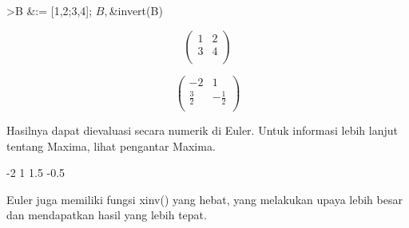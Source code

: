 \documentclass[a4paper,10pt]{article}
\begin{document}
\begin{eulernotebook}
\begin{eulercomment}
\begin{eulercomment}
\begin{eulercomment}
\begin{eulercomment}
\begin{eulercomment}
\begin{eulercomment}
\begin{eulerttcomment}
\end{eulerttcomment}
\begin{eulerprompt}
>B &:= [1,2;3,4]; $B, $&invert(B)
\end{eulerprompt}
\begin{eulerformula}
\[
\begin{pmatrix}1 & 2 \\ 3 & 4 \\ \end{pmatrix}
\]
\end{eulerformula}
\begin{eulerformula}
\[
\begin{pmatrix}-2 & 1 \\ \frac{3}{2} & -\frac{1}{2} \\ 
 \end{pmatrix}
\]
\end{eulerformula}
\begin{eulercomment}
Hasilnya dapat dievaluasi secara numerik di Euler. Untuk informasi
lebih lanjut tentang Maxima, lihat pengantar Maxima.
\end{eulercomment}
\begin{euleroutput}
             -2             1 
            1.5          -0.5 
\end{euleroutput}
\begin{eulercomment}
Euler juga memiliki fungsi xinv() yang hebat, yang melakukan upaya
lebih besar dan mendapatkan hasil yang lebih tepat.


\end{eulercomment}
\end{eulercomment}
\end{eulercomment}
\end{eulercomment}
\end{eulercomment}
\end{eulercomment}
\end{eulercomment}
\end{eulernotebook}
\end{document}
